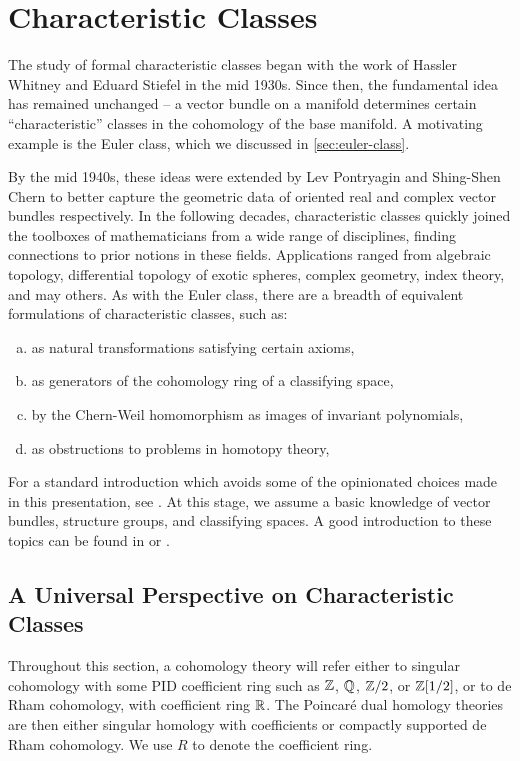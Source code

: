 \section{Characteristic Classes}\label{sec:characteristic-classes}
The study of formal characteristic classes began with the work of Hassler Whitney and Eduard Stiefel in the mid 1930s. Since then, the fundamental idea has remained unchanged -- a vector bundle on a manifold determines certain ``characteristic'' classes in the cohomology of the base manifold. A motivating example is the Euler class, which we discussed in \cref{sec:euler-class}.


By the mid 1940s, these ideas were extended by Lev Pontryagin and Shing-Shen Chern to better capture the geometric data of oriented real and complex vector bundles respectively. In the following decades, characteristic classes quickly joined the toolboxes of mathematicians from a wide range of disciplines, finding connections to prior notions in these fields.
Applications ranged from algebraic topology, differential topology of exotic spheres, complex geometry, index theory, and may others.
As with the Euler class, there are a breadth of equivalent formulations of characteristic classes, such as:
\begin{enumerate}[(a)]
	\item as natural transformations satisfying certain axioms,
	\item as generators of the cohomology ring of a classifying space,
	\item by the Chern-Weil homomorphism as images of invariant polynomials,
	\item as obstructions to problems in homotopy theory,
\end{enumerate}

For a standard introduction which avoids some of the opinionated choices made in this presentation, see \cite{milnorstasheff1974}.
At this stage, we assume a basic knowledge of vector bundles, structure groups, and classifying spaces. A good introduction to these topics can be found in \cite{botttu1982differential} or \cite{hatcher2003ktheory}.

\subsection{A Universal Perspective on Characteristic Classes}\label{sec:axiomatic-characteristic-classes}

Throughout this section, a cohomology theory will refer either to singular cohomology with some PID coefficient ring such as $\mathbb{Z}$, $\mathbb{Q}$, $\mathbb{Z}/2$, or $\mathbb{Z}[1/2]$, or to de Rham cohomology, with coefficient ring $\mathbb{R}$. The Poincar\'e dual homology theories are then either singular homology with coefficients or compactly supported de Rham cohomology. We use $R$ to denote the coefficient ring.

